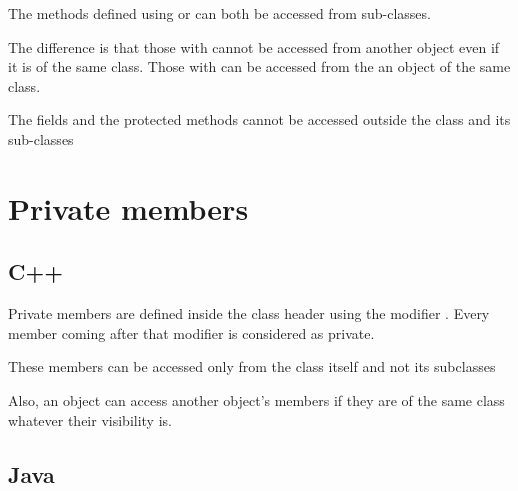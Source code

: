 \documentclass{KodeBook}
\begin{document}


The methods defined using  or  can both be accessed from sub-classes.



The difference is that those with  cannot be accessed from another object even if it is of the same class. 
Those with  can be accessed from the an object of the same class.



The fields and the protected methods cannot be accessed outside the class and its sub-classes



\section{Private members}

\subsection{C++}

Private members are defined inside the class header using the modifier . 
Every member coming after that modifier is considered as private.



These members can be accessed only from the class itself and not its subclasses



Also, an object can access another object's members if they are of the same class whatever their visibility is.



\subsection{Java}
\end{document}
